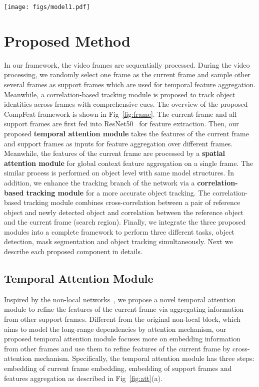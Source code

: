 \documentclass[letterpaper]{article} \usepackage{aaai21}  \usepackage{times}  \usepackage{helvet} \usepackage{courier}  \usepackage[hyphens]{url}  \usepackage{graphicx} \urlstyle{rm} \def\UrlFont{\rm}  \usepackage{natbib}  \usepackage{caption} \frenchspacing  \setlength{\pdfpagewidth}{8.5in}  \setlength{\pdfpageheight}{11in}  \newcommand{\etal}{\emph{et al. }}
\begin{document}
\begin{figure*}[t]
	\centering
	\texttt{[image: figs/model1.pdf]}
\caption{An overview of our proposed CompFeat approach for video instance segmentation. CompFeat consists of three major components: (a) A frame level attention module incorporating both temporal and spatial attention modules. (b) An object level attention module which has a similar structure as frame level attention. (c) A correlation-based tracking module to predict the correlation score and correlation map simultaneously.}
	\label{fig:frame}
\end{figure*} \section{Proposed Method}\label{method}
In our framework, the video frames are sequentially processed. During the video processing, we randomly select one frame as the current frame and sample other several frames as support frames which are used for temporal feature aggregation. Meanwhile, a correlation-based tracking module is proposed to track object identities across frames with comprehensive cues. The overview of the proposed CompFeat framework is shown in Fig~\ref{fig:frame}. The current frame and all support frames are first fed into ResNet50~\cite{he2016deep} for feature extraction. Then, our proposed {\bf temporal attention module} takes the features of the current frame and support frames as inputs for feature aggregation over different frames. Meanwhile, the features of the current frame are processed by a {\bf spatial attention module} for global context feature aggregation on a single frame. The similar process is performed on object level with same model structures. In addition, we enhance the tracking branch of the network via a {\bf correlation-based tracking module} for a more accurate object tracking. The correlation-based tracking module combines cross-correlation between a pair of reference object and newly detected object and correlation between the reference object and the current frame (search region). Finally, we integrate the three proposed modules into a complete framework to perform three different tasks, object detection, mask segmentation and object tracking simultaneously. Next we describe each proposed component in details.

\subsection{Temporal Attention Module}
Inspired by the non-local networks~\cite{wang2018non}, we propose a novel temporal attention module to refine the features of the current frame via aggregating information from other support frames. Different from the original non-local block, which aims to model the long-range dependencies by attention mechanism, our proposed temporal attention module focuses more on embedding information from other frames and use them to refine features of the current frame by cross-attention mechanism. Specifically, the temporal attention module has three steps: embedding of current frame embedding, embedding of support frames and features aggregation as described in Fig~\ref{fig:att}(a).
\end{document}
